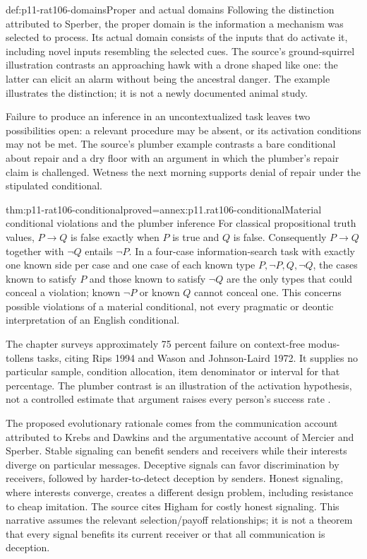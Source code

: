 \begin{hbdefinition}{def:p11-rat106-domains}{Proper and actual domains}
Following the distinction attributed to Sperber, the proper domain is
the information a mechanism was selected to process. Its actual domain
consists of the inputs that do activate it, including novel inputs
resembling the selected cues. The source's ground-squirrel illustration
contrasts an approaching hawk with a drone shaped like one: the latter
can elicit an alarm without being the ancestral danger. The example
illustrates the distinction; it is not a newly documented animal study.
\end{hbdefinition}

Failure to produce an inference in an uncontextualized task leaves two
possibilities open: a relevant procedure may be absent, or its activation
conditions may not be met. The source's plumber example contrasts a
bare conditional about repair and a dry floor with an argument in which
the plumber's repair claim is challenged. Wetness the next morning
supports denial of repair under the stipulated conditional.

\begin{hbtheorem}{thm:p11-rat106-conditional}{proved=annex:p11.rat106-conditional}{Material conditional violations and the plumber inference}
For classical propositional truth values, \(P\to Q\) is false
exactly when \(P\) is true and \(Q\) is false. Consequently
\(P\to Q\) together with \(\neg Q\) entails \(\neg P\).
In a four-case information-search task with exactly one known side
per case and one case of each known type \(P,\neg P,Q,\neg Q\),
the cases known to satisfy \(P\) and those known to
satisfy \(\neg Q\) are the only types that could conceal a
violation; known \(\neg P\) or known \(Q\) cannot conceal one.
This concerns possible violations of a material conditional, not
every pragmatic or deontic interpretation of an English conditional.
\end{hbtheorem}

The chapter surveys approximately 75 percent failure on context-free
modus-tollens tasks, citing Rips 1994 and Wason and Johnson-Laird 1972.
It supplies no particular sample, condition allocation, item denominator
or interval for that percentage. The plumber contrast is an illustration
of the activation hypothesis, not a controlled estimate that argument
raises every person's success rate
\cite[pp.~637--638]{CosmidesTooby2021Adaptationism}.

The proposed evolutionary rationale comes from the communication
account attributed to Krebs and Dawkins and the argumentative account
of Mercier and Sperber. Stable signaling can benefit senders and
receivers while their interests diverge on particular messages.
Deceptive signals can favor discrimination by receivers, followed by
harder-to-detect deception by senders. Honest signaling, where interests
converge, creates a different design problem, including resistance to
cheap imitation. The source cites Higham for costly honest signaling.
This narrative assumes the relevant selection/payoff relationships;
it is not a theorem that every signal benefits its current receiver or
that all communication is deception.

